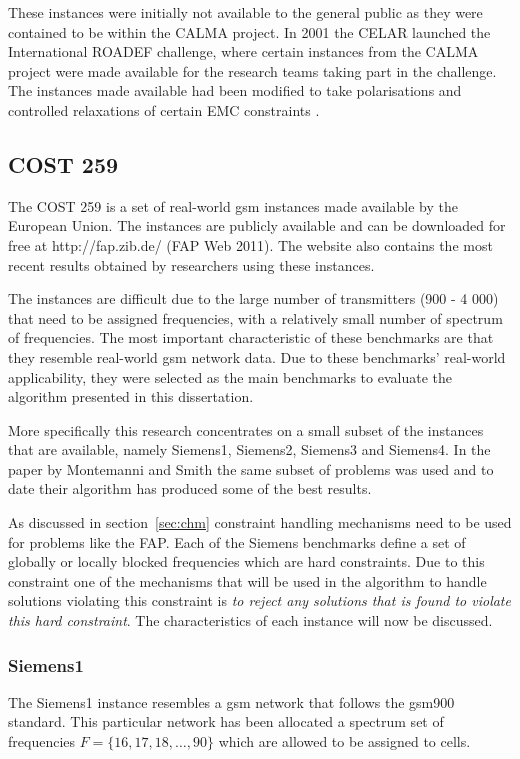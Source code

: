 These instances were initially not available to the general public as they were contained to be within the CALMA project\cite{CALMA}. In 2001 the CELAR launched the International ROADEF challenge, where certain instances from the CALMA project were made available for the research teams taking part in the challenge\cite{CALMA}. The instances made available had been modified to take polarisations and controlled relaxations of certain EMC constraints \cite{LowerPolarFAP}.
\subsection{COST 259}
\label{sec:COST259}
The \gls{COST} 259 is a set of real-world \gls{gsm} instances made available by the European Union. The instances are publicly available and can  be downloaded for free at http://fap.zib.de/ (FAP Web 2011). The website also contains the most recent results obtained by researchers using these instances\cite{Karen2004,Eisenblatter}.

The instances are difficult due to the large number of transmitters (900 - 4 000) that need to be assigned frequencies, with a relatively small number of spectrum of frequencies. The most important characteristic of these benchmarks are that they resemble real-world \gls{gsm} network data. Due to these benchmarks' real-world applicability, they were selected as the main benchmarks to evaluate the algorithm presented in this dissertation.

More specifically this research concentrates on a small subset of the instances that are available, namely Siemens1, Siemens2, Siemens3 and Siemens4. In the paper by Montemanni and Smith \cite{TabuMontemanniSmith} the same subset of problems was used and to date their algorithm has produced some of the best results. 

As discussed in section~\ref{sec:chm} constraint handling mechanisms need to be used for problems like the \gls{FAP}. Each of the Siemens benchmarks define a set of globally or locally blocked frequencies which are hard constraints. Due to this constraint one of the mechanisms that will be used in the algorithm to handle solutions violating this constraint is \emph{to reject any solutions that is found to violate this hard constraint}. The characteristics of each instance will now be discussed.


\subsubsection{Siemens1}
The Siemens1 instance resembles a \gls{gsm} network that follows the \gls{gsm}900 standard. This particular network has been allocated a spectrum set of frequencies $F = \{16,17,18,\dots,90\}$ which are allowed to be assigned to cells. 

